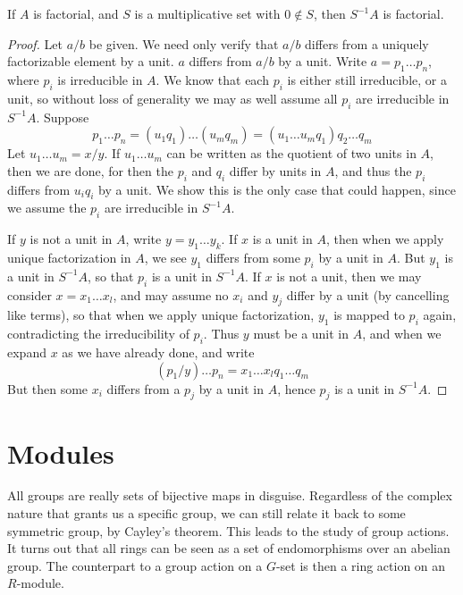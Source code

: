 \begin{theorem}
    If $A$ is factorial, and $S$ is a multiplicative set with $0 \not \in S$, then $S^{-1}A$ is factorial.
\end{theorem}
\begin{proof}
    Let $a/b$ be given. We need only verify that $a/b$ differs from a uniquely factorizable element by a unit. $a$ differs from $a/b$ by a unit. Write $a = p_1 \dots p_n$, where $p_i$ is irreducible in $A$. We know that each $p_i$ is either still irreducible, or a unit, so without loss of generality we may as well assume all $p_i$ are irreducible in $S^{-1}A$. Suppose
    \[ p_1 \dots p_n = (u_1 q_1) \dots (u_m q_m) = (u_1 \dots u_m q_1) q_2 \dots q_m \]
    Let $u_1 \dots u_m = x/y$. If $u_1 \dots u_m$ can be written as the quotient of two units in $A$, then we are done, for then the $p_i$ and $q_i$ differ by units in $A$, and thus the $p_i$ differs from $u_i q_i$ by a unit. We show this is the only case that could happen, since we assume the $p_i$ are irreducible in $S^{-1}A$.

    If $y$ is not a unit in $A$, write $y = y_1 \dots y_k$. If $x$ is a unit in $A$, then when we apply unique factorization in $A$, we see $y_1$ differs from some $p_i$ by a unit in $A$. But $y_1$ is a unit in $S^{-1}A$, so that $p_i$ is a unit in $S^{-1}A$. If $x$ is not a unit, then we may consider $x = x_1 \dots x_{l}$, and may assume no $x_i$ and $y_j$ differ by a unit (by cancelling like terms), so that when we apply unique factorization, $y_1$ is mapped to $p_i$ again, contradicting the irreducibility of $p_i$. Thus $y$ must be a unit in $A$, and when we expand $x$ as we have already done, and write
    \[ (p_1/y) \dots p_n = x_1 \dots x_{l} q_1 \dots q_m \]
    But then some $x_i$ differs from a $p_j$ by a unit in $A$, hence $p_j$ is a unit in $S^{-1}A$.
\end{proof}




\chapter{Modules}

All groups are really sets of bijective maps in disguise. Regardless of the complex nature that grants us a specific group, we can still relate it back to some symmetric group, by Cayley's theorem. This leads to the study of group actions. It turns out that all rings can be seen as a set of endomorphisms over an abelian group. The counterpart to a group action on a $G$-set is then a ring action on an $R$-module.

